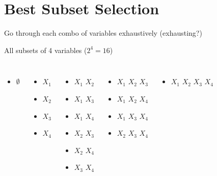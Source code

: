 \documentclass[aspectratio=169,usenames,dvipsnames]{beamer}
\newcommand{\InstructorList}[1]{
\begin{itemize}
	\color{orange}
	#1
\end{itemize}
}
\renewcommand{\InstructorList}[1]{}
\begin{document}
\section{Best Subset Selection}
\begin{frame}[c]{Go through each combo of variables exhaustively (exhausting?)}

	\centering
All subsets of 4 variables ($2^4 = 16$)

\begin{columns}
\centering
\begin{itemize}
	\item $\emptyset$
\end{itemize}
\centering

\begin{itemize}
	\item $X_1$
	\item $X_2$
	\item $X_3$
	\item $X_4$
\end{itemize}
\centering
\begin{itemize}
	\item $X_1$ $X_2$
	\item $X_1$ $X_3$
	\item $X_1$ $X_4$
	\item $X_2$ $X_3$
	\item $X_2$ $X_4$
	\item $X_3$ $X_4$
\end{itemize}
\centering
\begin{itemize}
	\item $X_1$ $X_2$ $X_3$
	\item $X_1$ $X_2$ $X_4$
	\item $X_1$ $X_3$ $X_4$
	\item $X_2$ $X_3$ $X_4$
\end{itemize}
\centering
\begin{itemize}
	\item $X_1$ $X_2$ $X_3$ $X_4$
\end{itemize}
\end{columns}

\InstructorList{
	\item The game: fit the model $2^n$ times, score each, pick one with best score
	\item point out this is tiered by number of variables (k) out of p variables
	\item easy to compare model with the same k (no order difference) 
	\item after come back from next slide: each tier has p choose k combos $\binom{p}{k} = \dfrac{p!}{k!(p-k)!}$
}
\end{frame}
\end{document}
